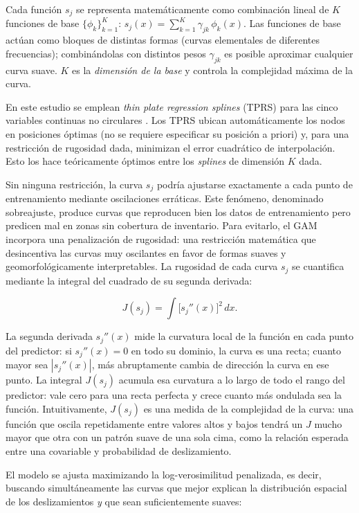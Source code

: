 \documentclass[12pt,a4paper]{article}
\begin{document}
Cada función $s_j$ se representa matemáticamente como combinación
lineal de $K$ funciones de base $\{\phi_k\}_{k=1}^{K}$:
$s_j(x) = \sum_{k=1}^{K} \gamma_{jk}\,\phi_k(x)$.
Las funciones de base actúan como bloques de distintas
formas (curvas elementales de diferentes frecuencias); combinándolas
con distintos pesos $\gamma_{jk}$ es posible aproximar cualquier curva
suave. $K$ es la \textit{dimensión de la base} y controla la
complejidad máxima de la curva.

En este estudio se emplean \textit{thin plate regression splines}
(TPRS) para las cinco variables continuas no circulares
\citep{wood2017generalized}. Los TPRS ubican automáticamente los nodos
en posiciones óptimas (no se requiere especificar su posición a priori)
y, para una restricción de rugosidad dada, minimizan el error cuadrático
de interpolación. Esto los hace teóricamente óptimos entre los
\textit{splines} de dimensión $K$ dada.

Sin ninguna restricción, la curva $s_j$ podría ajustarse exactamente a
cada punto de entrenamiento mediante oscilaciones erráticas. Este
fenómeno, denominado sobreajuste, produce curvas que
reproducen bien los datos de entrenamiento pero predicen mal en zonas
sin cobertura de inventario. Para evitarlo, el GAM incorpora una
penalización de rugosidad: una restricción matemática que
desincentiva las curvas muy oscilantes en favor de formas suaves y
geomorfológicamente interpretables. La rugosidad de cada curva $s_j$
se cuantifica mediante la integral del cuadrado de su segunda derivada:

\begin{equation}
    J(s_j) = \int \bigl[s_j''(x)\bigr]^2\,dx.
    \label{eq:penalty}
\end{equation}

La segunda derivada $s_j''(x)$ mide la curvatura local de la función
en cada punto del predictor: si $s_j''(x) = 0$ en todo su dominio, la
curva es una recta; cuanto mayor sea $|s_j''(x)|$, más abruptamente
cambia de dirección la curva en ese punto. La integral $J(s_j)$
acumula esa curvatura a lo largo de todo el rango del predictor: vale
cero para una recta perfecta y crece cuanto más ondulada sea la
función. Intuitivamente, $J(s_j)$ es una medida de la complejidad de la curva: una función que oscila repetidamente entre valores altos
y bajos tendrá un $J$ mucho mayor que otra con un patrón suave de una
sola cima, como la relación esperada entre una covariable y probabilidad de
deslizamiento.

El modelo se ajusta maximizando la log-verosimilitud
penalizada, es decir, buscando simultáneamente las curvas que mejor
explican la distribución espacial de los deslizamientos \emph{y} que
sean suficientemente suaves:
\end{document}
